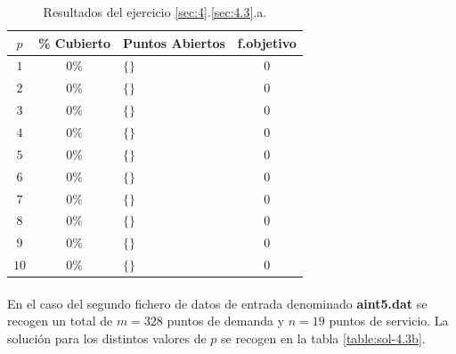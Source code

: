 \documentclass[spanish]{article}
\begin{document}
			\begin{table}[h]
				\begin{center}
					\begin{tabular}{|c || c || l || c | }
						\hline
						$p$		&	\% Cubierto	& Puntos Abiertos 					& f.objetivo \\ \hline \hline
						$1$ 	& $0\%$ & $\{\}$ 										& $0$ \\ \hline
						$2$ 	& $0\%$ & $\{\}$ 										& $0$ \\ \hline
						$3$ 	& $0\%$ & $\{\}$ 										& $0$ \\ \hline
						$4$ 	& $0\%$ & $\{\}$ 										& $0$ \\ \hline
						$5$ 	& $0\%$ & $\{\}$ 										& $0$ \\ \hline
						$6$ 	& $0\%$ & $\{\}$ 										& $0$ \\ \hline
						$7$ 	& $0\%$ & $\{\}$ 										& $0$ \\ \hline
						$8$ 	& $0\%$ & $\{\}$ 										& $0$ \\ \hline
						$9$ 	& $0\%$ & $\{\}$ 										& $0$ \\ \hline
						$10$ 	& $0\%$ & $\{\}$ 										& $0$ \\
						\hline
					\end{tabular}
				\end{center}
				\caption{Resultados del ejercicio \ref{sec:4}.\ref{sec:4.3}.a.}
				\label{table:sol-4.3a}
			\end{table}

			\paragraph{}
			En el caso del segundo fichero de datos de entrada denominado \textbf{aint5.dat} se recogen un total de $m = 328$ puntos de demanda y $n=19$ puntos de servicio. La solución para los distintos valores de $p$ se recogen en la tabla \ref{table:sol-4.3b}.
\end{document}
